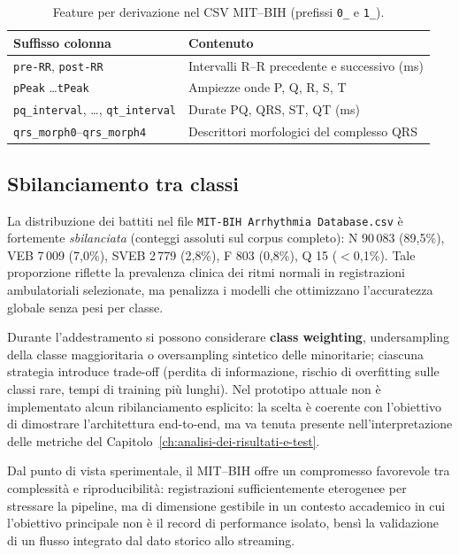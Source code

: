 \begin{table}[H]
  \centering
  \caption{Feature per derivazione nel CSV MIT--BIH (prefissi \texttt{0\_} e \texttt{1\_}).}
  \label{tab:csv-schema}
  \begin{tabular}{@{}lp{7.2cm}@{}}
    \toprule
    \textbf{Suffisso colonna} & \textbf{Contenuto} \\
    \midrule
    \texttt{pre-RR}, \texttt{post-RR} & Intervalli R--R precedente e successivo (ms) \\
    \texttt{pPeak} \ldots \texttt{tPeak} & Ampiezze onde P, Q, R, S, T \\
    \texttt{pq\_interval}, \ldots, \texttt{qt\_interval} & Durate PQ, QRS, ST, QT (ms) \\
    \texttt{qrs\_morph0}--\texttt{qrs\_morph4} & Descrittori morfologici del complesso QRS \\
    \bottomrule
  \end{tabular}
\end{table}

\subsection{Sbilanciamento tra classi}

La distribuzione dei battiti nel file \texttt{MIT-BIH Arrhythmia Database.csv} è fortemente \emph{sbilanciata} (conteggi assoluti sul corpus completo):
N 90\,083 (89{,}5\%), VEB 7\,009 (7{,}0\%), SVEB 2\,779 (2{,}8\%), F 803 (0{,}8\%), Q 15 ($<$0{,}1\%).
Tale proporzione riflette la prevalenza clinica dei ritmi normali in registrazioni ambulatoriali selezionate, ma penalizza i modelli che ottimizzano l'accuratezza globale senza pesi per classe.

Durante l'addestramento si possono considerare \textbf{class weighting}, undersampling della classe maggioritaria o oversampling sintetico delle minoritarie; ciascuna strategia introduce trade-off (perdita di informazione, rischio di overfitting sulle classi rare, tempi di training più lunghi).
Nel prototipo attuale non è implementato alcun ribilanciamento esplicito: la scelta è coerente con l'obiettivo di dimostrare l'architettura end-to-end, ma va tenuta presente nell'interpretazione delle metriche del Capitolo~\ref{ch:analisi-dei-risultati-e-test}.

Dal punto di vista sperimentale, il MIT--BIH offre un compromesso favorevole tra complessità e riproducibilità: registrazioni sufficientemente eterogenee per stressare la pipeline, ma di dimensione gestibile in un contesto accademico in cui l'obiettivo principale non è il record di performance isolato, bensì la validazione di un flusso integrato dal dato storico allo streaming.

